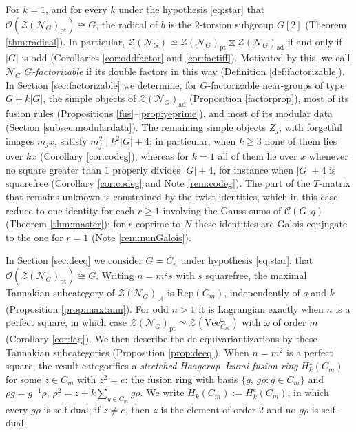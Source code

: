 \documentclass[10pt]{article}
\theoremstyle{plain}
\theoremstyle{definition}
\theoremstyle{plain}
\begin{document}
\par For $k=1$, and for every $k$ under the hypothesis \eqref{eq:star} that $\mathcal{O}(\mathcal{Z}(\mathcal{N}_G)_\mathrm{pt})\cong G$, the radical of $b$ is the $2$-torsion subgroup $G[2]$ (Theorem \ref{thm:radical}). In particular, $\mathcal{Z}(\mathcal{N}_G)\simeq\mathcal{Z}(\mathcal{N}_G)_\mathrm{pt}\boxtimes\mathcal{Z}(\mathcal{N}_G)_\mathrm{ad}$ if and only if $|G|$ is odd (Corollaries \ref{cor:oddfactor} and \ref{cor:factiff}). Motivated by this, we call $\mathcal{N}_G$ \emph{$G$-factorizable} if its double factors in this way (Definition \ref{def:factorizable}). In Section \ref{sec:factorizable} we determine, for $G$-factorizable near-groups of type $G+k|G|$, the simple objects of $\mathcal{Z}(\mathcal{N}_G)_\mathrm{ad}$ (Proposition \ref{factorprop}), most of its fusion rules (Propositions \ref{fus}--\ref{prop:yeprime}), and most of its modular data (Section \ref{subsec:modulardata}). The remaining simple objects $Z_j$, with forgetful images $m_jx$, satisfy $m_j^2\mid k^2|G|+4$; in particular, when $k\geq3$ none of them lies over $kx$ (Corollary \ref{cor:codeg}), whereas for $k=1$ all of them lie over $x$ whenever no square greater than $1$ properly divides $|G|+4$, for instance when $|G|+4$ is squarefree (Corollary \ref{cor:codeg} and Note \ref{rem:codeg}). The part of the $T$-matrix that remains unknown is constrained by the twist identities, which in this case reduce to one identity for each $r\geq1$ involving the Gauss sums of $\mathcal{C}(G,q)$ (Theorem \ref{thm:master}); for $r$ coprime to $N$ these identities are Galois conjugate to the one for $r=1$ (Note \ref{rem:nunGalois}).

\par In Section \ref{sec:deeq} we consider $G=C_n$ under hypothesis \eqref{eq:star}: that $\mathcal{O}(\mathcal{Z}(\mathcal{N}_G)_\mathrm{pt})\cong G$. Writing $n=m^2s$ with $s$ squarefree, the maximal Tannakian subcategory of $\mathcal{Z}(\mathcal{N}_G)_\mathrm{pt}$ is $\mathrm{Rep}(C_m)$, independently of $q$ and $k$ (Proposition \ref{prop:maxtann}). For odd $n>1$ it is Lagrangian exactly when $n$ is a perfect square, in which case $\mathcal{Z}(\mathcal{N}_G)_\mathrm{pt}\simeq\mathcal{Z}(\mathrm{Vec}_{C_m}^\omega)$ with $\omega$ of order $m$ (Corollary \ref{cor:lag}). We then describe the de-equivariantizations by these Tannakian subcategories (Proposition \ref{prop:deeq}). When $n=m^2$ is a perfect square, the result categorifies a \emph{stretched Haagerup--Izumi fusion ring} $H_k^z(C_m)$ for some $z\in C_m$ with $z^2=e$: the fusion ring with basis $\{g,\,g\rho:g\in C_m\}$ and $\rho g=g^{-1}\rho$, $\rho^2=z+k\sum_{g\in C_m}g\rho$. We write $H_k(C_m):=H_k^e(C_m)$, in which every $g\rho$ is self-dual; if $z\neq e$, then $z$ is the element of order $2$ and no $g\rho$ is self-dual.
\end{document}
